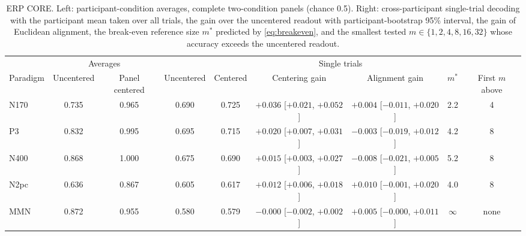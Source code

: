 \begin{table}[t]
\centering
\caption{ERP CORE. Left: participant-condition averages, complete two-condition panels (chance 0.5). Right: cross-participant single-trial decoding with the participant mean taken over all trials, the gain over the uncentered readout with participant-bootstrap 95\% interval, the gain of Euclidean alignment, the break-even reference size $m^\ast$ predicted by \eqref{eq:breakeven}, and the smallest tested $m\in\{1,2,4,8,16,32\}$ whose accuracy exceeds the uncentered readout.}
\label{tab:erpcore}
\begin{tabular}{lcc|cccccc}
\toprule
 & \multicolumn{2}{c|}{Averages} & \multicolumn{6}{c}{Single trials} \\
Paradigm & Uncentered & Panel centered & Uncentered & Centered & Centering gain & Alignment gain & $m^\ast$ & First $m$ above \\
\midrule
N170 & 0.735 & 0.965 & 0.690 & 0.725 & $+0.036$ [$+0.021$, $+0.052$] & $+0.004$ [$-0.011$, $+0.020$] & 2.2 & 4 \\
P3 & 0.832 & 0.995 & 0.695 & 0.715 & $+0.020$ [$+0.007$, $+0.031$] & $-0.003$ [$-0.019$, $+0.012$] & 4.2 & 8 \\
N400 & 0.868 & 1.000 & 0.675 & 0.690 & $+0.015$ [$+0.003$, $+0.027$] & $-0.008$ [$-0.021$, $+0.005$] & 5.2 & 8 \\
N2pc & 0.636 & 0.867 & 0.605 & 0.617 & $+0.012$ [$+0.006$, $+0.018$] & $+0.010$ [$-0.001$, $+0.020$] & 4.0 & 8 \\
MMN & 0.872 & 0.955 & 0.580 & 0.579 & $-0.000$ [$-0.002$, $+0.002$] & $+0.005$ [$-0.000$, $+0.011$] & $\infty$ & none \\
\bottomrule
\end{tabular}
\end{table}
